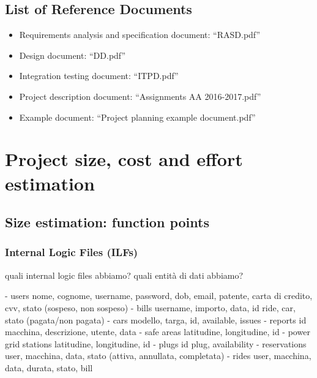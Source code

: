 \documentclass[english]{article}
\begin{document}

\subsection{List of Reference Documents}

\begin{itemize}
	\item{Requirements analysis and specification document: “RASD.pdf”}
	\item{Design document: “DD.pdf”}
	\item{Integration testing document: “ITPD.pdf”}
	\item{Project description document: “Assignments AA 2016-2017.pdf”}
	\item{Example document: “Project planning example document.pdf”}
\end{itemize}

\section{Project size, cost and effort estimation}


\subsection{Size estimation: function points}


\subsubsection{Internal Logic Files (ILFs)}

quali internal logic files abbiamo?
quali entità di dati abbiamo?

- users
nome, cognome, username, password, dob, email, patente, carta di credito, cvv, stato (sospeso, non sospeso)
- bills
username, importo, data, id ride, car, stato (pagata/non pagata)
- cars
modello, targa, id, available, issues
- reports
id macchina, descrizione, utente, data
- safe areas
latitudine, longitudine, id
- power grid stations
latitudine, longitudine, id
- plugs
id plug, availability
- reservations
user, macchina, data, stato (attiva, annullata, completata)
- rides
user, macchina, data, durata, stato, bill
\end{document}
